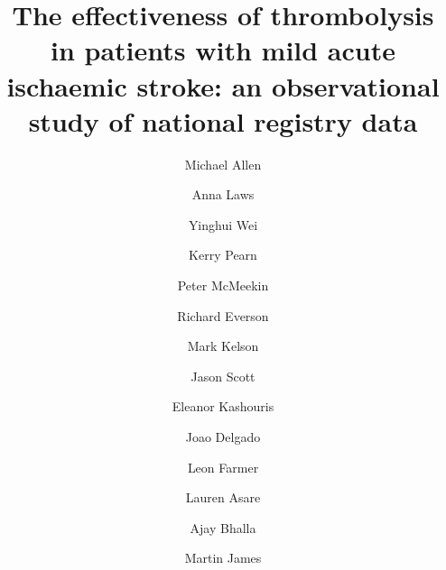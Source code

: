 \title{The effectiveness of thrombolysis in patients with mild acute ischaemic stroke: an observational study of national registry data}


\renewcommand{\thefootnote}{\fnsymbol{footnote}}

\author[*1,2]{Michael Allen}
\author[1,2]{Anna Laws}
\author[1,2]{Yinghui Wei}
\author[1,2]{Kerry Pearn}
\author[4]{Peter McMeekin}
\author[3]{Richard Everson}
\author[3]{Mark Kelson}
\author[4]{Jason Scott}
\author[4]{Eleanor Kashouris}
\author[1]{Joao Delgado}
\author[1,2]{Leon Farmer}
\author[1,2]{Lauren Asare}
\author[5]{Ajay Bhalla}
\author[1,2]{Martin James}


\date{}